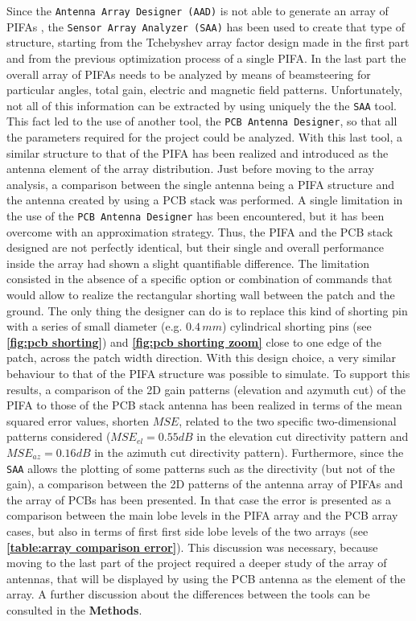 \documentclass[10 pt,a4paper,twocolumn]{article}
\begin{document}
{Since the \texttt{\color{Mahogany}Antenna Array Designer (AAD)} is not able to generate an array of PIFAs , the \texttt{\color{Mahogany}Sensor Array Analyzer (SAA)} has been used to create that type of structure, starting from the Tchebyshev array factor design made in the first part and from the previous optimization process of a single PIFA. In the last part the overall array of PIFAs needs to be analyzed by means of beamsteering for particular angles, total gain, electric and magnetic field patterns. Unfortunately, not all of this information can be extracted by using uniquely the the \texttt{\color{Mahogany}SAA} tool. This fact led to the use of another tool, the \texttt{\color{Mahogany}PCB Antenna Designer}, so that all the parameters required for the project could be analyzed. With this last tool, a similar structure to that of the PIFA has been realized and introduced as the antenna element of the array distribution. Just before moving to the array analysis, a comparison between the single antenna being a PIFA structure and the antenna created by using a PCB stack was performed. A single limitation in the use of the \texttt{\color{Mahogany}PCB Antenna Designer} has been encountered, but it has been overcome with an approximation strategy. Thus, the PIFA and the PCB stack designed are not perfectly identical, but their single and overall performance inside the array had shown a slight quantifiable difference. The limitation consisted in the absence of a specific option or combination of commands that would allow to realize the rectangular shorting wall between the patch and the ground. The only thing the designer can do is to replace this kind of shorting pin with a series of small diameter (e.g. $0.4\,mm$) cylindrical shorting pins (see \textbf{\cref{fig:pcb shorting}}) and \textbf{\cref{fig:pcb shorting zoom}} close to one edge of the patch, across the patch width direction. With this design choice, a very similar behaviour to that of the PIFA structure was possible to simulate. To support this results, a comparison of the 2D gain patterns (elevation and azymuth cut) of the PIFA to those of the PCB stack antenna has been realized in terms of the mean squared error values, shorten $MSE$, related to the two specific two-dimensional patterns considered ($MSE_{el}=0.55dB$ in the elevation cut directivity pattern and $MSE_{az}=0.16dB$ in the azimuth cut directivity pattern). Furthermore, since the \texttt{\color{Mahogany}SAA} allows the plotting of some patterns such as the directivity (but not of the gain), a comparison between the 2D patterns of the antenna array of PIFAs and the array of PCBs has been presented. In that case the error is presented as a comparison between the main lobe levels in the PIFA array and the PCB array cases, but also in terms of first first side lobe levels of the two arrays (see \textbf{\cref{table:array comparison error}}). This discussion was necessary, because moving to the last part of the project required a deeper study of the array of antennas, that will be displayed by using the PCB antenna as the element of the array. A further discussion about the differences between the tools can be consulted in the \textbf{\color{BurntOrange} Methods}. 

}
\end{document}
